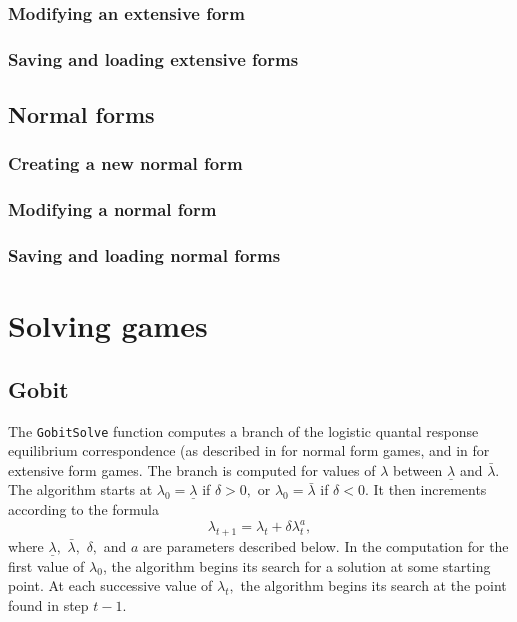 \subsubsection{Modifying an extensive form}

\subsubsection{Saving and loading extensive forms}

\subsection{Normal forms}

\subsubsection{Creating a new normal form}

\subsubsection{Modifying a normal form}

\subsubsection{Saving and loading normal forms}

\section{Solving games}

\subsection{Gobit}

The {\tt GobitSolve} function computes a branch of the logistic
quantal response equilibrium correspondence (as described in
\cite[1995]{McKPal:95a} for normal form games, and in
\cite[1995b]{McKPal:95b} for extensive form games.  The branch is
computed for values of $\lambda$ between $\underline{\lambda}$ and
$\bar{\lambda}.$ The algorithm starts at $\lambda_0 =
\underline{\lambda}$ if $\delta>0,$ or $\lambda_0 = \bar{\lambda}$ if
$\delta<0$. It then increments according to the formula
$$
\lambda_{t+1} = \lambda_t +\delta \lambda_t^a,
$$ where $\underline\lambda,$ $\bar\lambda,$ $\delta,$ and $a$ are
parameters described below. In the computation for the first value of
$\lambda_0$, the algorithm begins its search for a solution at some
starting point.  At each
successive value of $\lambda_t,$ the algorithm begins its search at
the point found in step $t - 1.$ 

